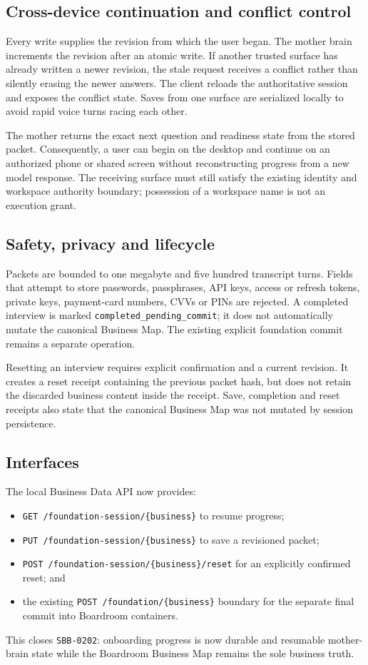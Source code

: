 \subsection{Cross-device continuation and conflict control}

Every write supplies the revision from which the user began.  The mother brain
increments the revision after an atomic write.  If another trusted surface has
already written a newer revision, the stale request receives a conflict rather than
silently erasing the newer answers.  The client reloads the authoritative session
and exposes the conflict state.  Saves from one surface are serialized locally to
avoid rapid voice turns racing each other.

The mother returns the exact next question and readiness state from the stored
packet.  Consequently, a user can begin on the desktop and continue on an authorized
phone or shared screen without reconstructing progress from a new model response.
The receiving surface must still satisfy the existing identity and workspace
authority boundary; possession of a workspace name is not an execution grant.

\subsection{Safety, privacy and lifecycle}

Packets are bounded to one megabyte and five hundred transcript turns.  Fields that
attempt to store passwords, passphrases, API keys, access or refresh tokens, private
keys, payment-card numbers, CVVs or PINs are rejected.  A completed interview is
marked \texttt{completed\_pending\_commit}; it does not automatically mutate the
canonical Business Map.  The existing explicit foundation commit remains a separate
operation.

Resetting an interview requires explicit confirmation and a current revision.  It
creates a reset receipt containing the previous packet hash, but does not retain the
discarded business content inside the receipt.  Save, completion and reset receipts
also state that the canonical Business Map was not mutated by session persistence.

\subsection{Interfaces}

The local Business Data API now provides:

\begin{itemize}
  \item \texttt{GET /foundation-session/\{business\}} to resume progress;
  \item \texttt{PUT /foundation-session/\{business\}} to save a revisioned packet;
  \item \texttt{POST /foundation-session/\{business\}/reset} for an explicitly
  confirmed reset; and
  \item the existing \texttt{POST /foundation/\{business\}} boundary for the
  separate final commit into Boardroom containers.
\end{itemize}

This closes \texttt{SBB-0202}: onboarding progress is now durable and resumable
mother-brain state while the Boardroom Business Map remains the sole business truth.
